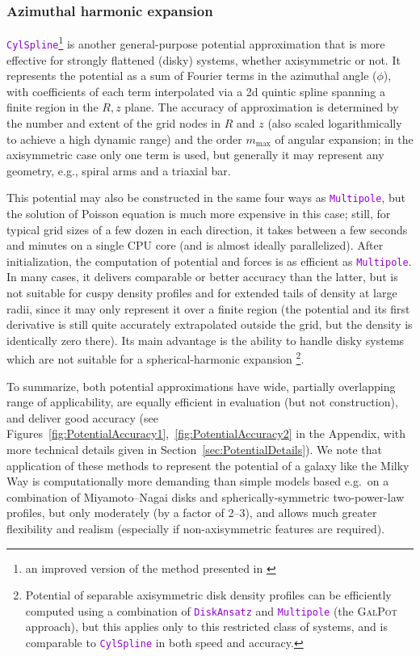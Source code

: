 \documentclass[12pt]{article}
\newcommand{\ttt}[1]{\textcolor{darkviolet}{\texttt{#1}}}
\begin{document}
\subsubsection{Azimuthal harmonic expansion}  \label{sec:PotentialCylSpline}

\ttt{CylSpline}\footnote{an improved version of the method presented in \cite{VasilievAthanassoula2015}} is another general-purpose potential approximation that is more effective for strongly flattened (disky) systems, whether axisymmetric or not. It represents the potential as a sum of Fourier terms in the azimuthal angle ($\phi$), with coefficients of each term interpolated via a 2d quintic spline spanning a finite region in the $R,z$ plane. The accuracy of approximation is determined by the number and extent of the grid nodes in $R$ and $z$ (also scaled logarithmically to achieve a high dynamic range) and the order $m_\mathrm{max}$ of angular expansion; in the axisymmetric case only one term is used, but generally it may represent any geometry, e.g., spiral arms and a triaxial bar.

This potential may also be constructed in the same four ways as \ttt{Multipole}, but the solution of Poisson equation is much more expensive in this case; still, for typical grid sizes of a few dozen in each direction, it takes between a few seconds and minutes on a single CPU core (and is almost ideally parallelized). After initialization, the computation of potential and forces is as efficient as \ttt{Multipole}. In many cases, it delivers comparable or better accuracy than the latter, but is not suitable for cuspy density profiles and for extended tails of density at large radii, since it may only represent it over a finite region (the potential and its first derivative is still quite accurately extrapolated outside the grid, but the density is identically zero there). Its main advantage is the ability to handle disky systems which are not suitable for a spherical-harmonic expansion%
\footnote{Potential of separable axisymmetric disk density profiles can be efficiently computed using a combination of \ttt{DiskAnsatz} and \ttt{Multipole} (the \textsc{GalPot} approach), but this applies only to this restricted class of systems, and is comparable to \ttt{CylSpline} in both speed and accuracy.}.

To summarize, both potential approximations have wide, partially overlapping range of applicability, are equally efficient in evaluation (but not construction), and deliver good accuracy (see Figures~\ref{fig:PotentialAccuracy1},~\ref{fig:PotentialAccuracy2} in the Appendix, with more technical details given in Section~\ref{sec:PotentialDetails}).
We note that application of these methods to represent the potential of a galaxy like the Milky Way is computationally more demanding than simple models based e.g.\ on a combination of Miyamoto--Nagai disks and spherically-symmetric two-power-law profiles, but only moderately (by a factor of 2--3), and allows much greater flexibility and realism (especially if non-axisymmetric features are required).
\end{document}
